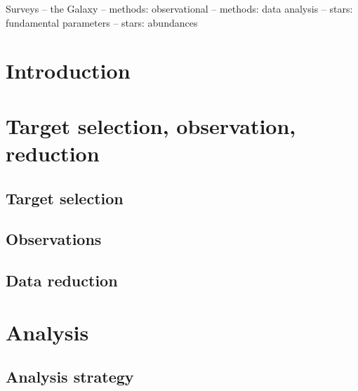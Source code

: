 \documentclass[fleqn,usenatbib,useAMS]{mnras}
\begin{document}
\begin{keywords}
Surveys -- 
the Galaxy --
methods: observational --
methods: data analysis --
stars: fundamental parameters -- 
stars: abundances
\end{keywords}



\section{Introduction} \label{sec:introduction}

\section{Target selection, observation, reduction} \label{sec:selection_observation_reduction}

\subsection{Target selection}\label{sec:target_selection}

\subsection{Observations}\label{sec:observation}
    
\subsection{Data reduction}\label{sec:reduction}


\section{Analysis} \label{sec:analysis}

\subsection{Analysis strategy} \label{sec:analysis_strategy}
\end{document}
